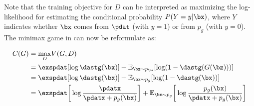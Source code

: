 \noindent Note that the training objective for $D$ can be interpreted as maximizing the log-likelihood for estimating the conditional probability $P(Y=y|\bx)$, where $Y$ indicates whether $\bx$ comes from $\pdat$ (with $y=1$) or from $p_g$ (with $y=0$). The minimax game in %
can now be reformulate as:

\begin{align*}
	C(G) &= \underset{D}{\max}V(G,D)\\
	&= \exspdat[\log \dastg(\bx)] + \mathbb{E}_{\bz\sim p_{\bz}}[\log(1-\dastg(G(\bz)))]\\ %
	&= \exspdat[\log \dastg(\bx)] + \mathbb{E}_{\bx\sim p_g}[\log(1-\dastg(\bx))]\\
	&= \exspdat\bigg[\log\frac{\pdatx}{\pdatx+p_g(\bx)}\bigg]+\mathbb{E}_{\bx\sim p_g}\bigg[\log\frac{p_g(\bx)}{\pdatx+p_g(\bx)}\bigg]
\end{align*}
